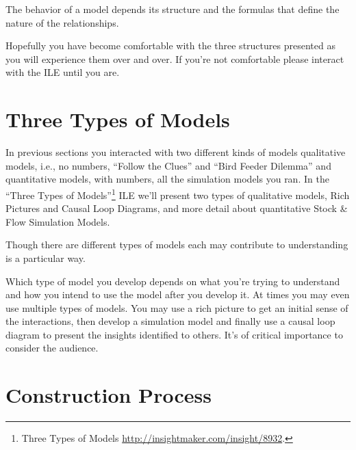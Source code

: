 \documentclass[]{memoir}
\begin{document}
\FloatBarrier 

\begin{model}[frametitle={Model: Similar Structures / Different Behavior}] 

 The behavior of a model depends its structure and the formulas that define the nature of the relationships.




 \end{model}

Hopefully you have become comfortable with the three structures
presented as you will experience them over and over. If you're not
comfortable please interact with the ILE until you are.

\section{Three Types of Models}

In previous sections you interacted with two different kinds of models
qualitative models, i.e., no numbers, ``Follow the Clues'' and ``Bird
Feeder Dilemma'' and quantitative models, with numbers, all the
simulation models you ran. In the ``Three Types of Models''\footnote{Three
  Types of Models \url{http://insightmaker.com/insight/8932}.} ILE we'll
present two types of qualitative models, Rich Pictures and Causal Loop
Diagrams, and more detail about quantitative Stock \& Flow Simulation
Models.

\FloatBarrier 

\begin{model}[frametitle={Model: Three Types of Models}] 

 Though there are different types of models each may contribute to understanding is a particular way.




 \end{model}

Which type of model you develop depends on what you're trying to
understand and how you intend to use the model after you develop it. At
times you may even use multiple types of models. You may use a rich
picture to get an initial sense of the interactions, then develop a
simulation model and finally use a causal loop diagram to present the
insights identified to others. It's of critical importance to consider
the audience.

\section{Construction Process}
\end{document}
